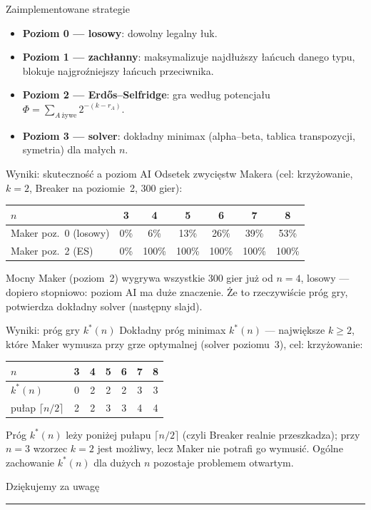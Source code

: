 \documentclass[11pt,aspectratio=169]{beamer}
\begin{document}
\begin{frame}{Zaimplementowane strategie}
  \begin{itemize}
    \item \textbf{Poziom 0 --- losowy}: dowolny legalny łuk.
    \item \textbf{Poziom 1 --- zachłanny}: maksymalizuje najdłuższy łańcuch danego typu, blokuje
      najgroźniejszy łańcuch przeciwnika.
    \item \textbf{Poziom 2 --- Erdős--Selfridge}: gra według potencjału
      $\Phi=\sum_{A\ \text{żywe}} 2^{-(k-r_A)}$.
    \item \textbf{Poziom 3 --- solver}: dokładny minimax (alpha--beta, tablica transpozycji,
      symetria) dla małych $n$.
  \end{itemize}
\end{frame}

\begin{frame}{Wyniki: skuteczność a poziom AI}
  Odsetek zwycięstw Makera (cel: krzyżowanie, $k=2$, Breaker na poziomie~2, 300 gier):
  \begin{center}
    \begin{tabular}{l|cccccc}
      \toprule
      $n$ & 3 & 4 & 5 & 6 & 7 & 8\\
      \midrule
      Maker poz.~0 (losowy) & 0\% & 6\% & 13\% & 26\% & 39\% & 53\%\\
      Maker poz.~2 (ES) & 0\% & 100\% & 100\% & 100\% & 100\% & 100\%\\
      \bottomrule
    \end{tabular}
  \end{center}
  \medskip
  Mocny Maker (poziom~2) wygrywa wszystkie 300 gier już od $n=4$, losowy --- dopiero stopniowo:
  poziom AI ma duże znaczenie. Że to rzeczywiście próg gry, potwierdza dokładny solver (następny
  slajd).
\end{frame}

\begin{frame}{Wyniki: próg gry $k^*(n)$}
  Dokładny próg minimax $k^*(n)$ --- największe $k\ge 2$, które Maker wymusza przy grze optymalnej
  (solver poziomu~3), cel: krzyżowanie:
  \begin{center}
    \begin{tabular}{l|cccccc}
      \toprule
      $n$ & 3 & 4 & 5 & 6 & 7 & 8\\
      \midrule
      $k^*(n)$ & 0 & 2 & 2 & 2 & 3 & 3\\
      pułap $\lceil n/2\rceil$ & 2 & 2 & 3 & 3 & 4 & 4\\
      \bottomrule
    \end{tabular}
  \end{center}
  \medskip
  Próg $k^*(n)$ leży poniżej pułapu $\lceil n/2\rceil$ (czyli Breaker realnie przeszkadza); przy $n=3$
  wzorzec $k=2$ jest możliwy, lecz Maker nie potrafi go wymusić. Ogólne zachowanie $k^*(n)$ dla
  dużych $n$ pozostaje \alert{problemem otwartym}.
\end{frame}

\begin{frame}[plain]
  \centering\vfill
  {\color{morange}Dziękujemy za uwagę}\\[0.6em]
  {\color{mteal}\rule{0.4\textwidth}{1.3pt}}
  \vfill
\end{frame}
\end{document}
